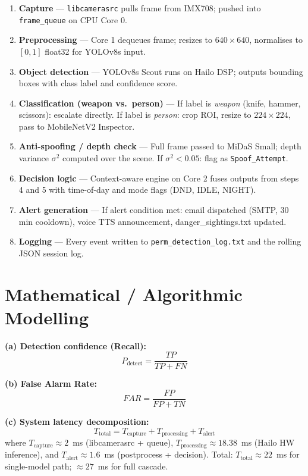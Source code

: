 \documentclass[12pt,a4paper]{article}
\begin{document}
\begin{enumerate}[noitemsep]
  \item \textbf{Capture} — \texttt{libcamerasrc} pulls frame from IMX708; pushed into
        \texttt{frame\_queue} on CPU Core 0.
  \item \textbf{Preprocessing} — Core 1 dequeues frame; resizes to $640\times640$,
        normalises to $[0,1]$ float32 for YOLOv8s input.
  \item \textbf{Object detection} — YOLOv8s Scout runs on Hailo DSP; outputs bounding
        boxes with class label and confidence score.
  \item \textbf{Classification (weapon vs.\ person)} — If label is \emph{weapon} (knife,
        hammer, scissors): escalate directly. If label is \emph{person}: crop ROI,
        resize to $224\times224$, pass to MobileNetV2 Inspector.
  \item \textbf{Anti-spoofing / depth check} — Full frame passed to MiDaS Small;
        depth variance $\sigma^2$ computed over the scene. If $\sigma^2 < 0.05$: flag
        as \texttt{Spoof\_Attempt}.
  \item \textbf{Decision logic} — Context-aware engine on Core 2 fuses outputs from
        steps 4 and 5 with time-of-day and mode flags (DND, IDLE, NIGHT).
  \item \textbf{Alert generation} — If alert condition met: email dispatched (SMTP,
        30 min cooldown), voice TTS announcement, danger\_sightings.txt updated.
  \item \textbf{Logging} — Every event written to \texttt{perm\_detection\_log.txt} and
        the rolling JSON session log.
\end{enumerate}

\section{Mathematical / Algorithmic Modelling}

\textbf{(a) Detection confidence (Recall):}
\begin{equation}
  P_{\text{detect}} = \frac{TP}{TP + FN}
  \label{eq:recall}
\end{equation}

\textbf{(b) False Alarm Rate:}
\begin{equation}
  FAR = \frac{FP}{FP + TN}
  \label{eq:far}
\end{equation}

\textbf{(c) System latency decomposition:}
\begin{equation}
  T_{\text{total}} = T_{\text{capture}} + T_{\text{processing}} + T_{\text{alert}}
  \label{eq:latency}
\end{equation}
where $T_{\text{capture}} \approx 2$~ms (libcamerasrc + queue),
$T_{\text{processing}} \approx 18.38$~ms (Hailo HW inference),
and $T_{\text{alert}} \approx 1.6$~ms (postprocess + decision). Total: $T_{\text{total}} \approx 22$~ms for single-model path; $\approx 27$~ms for full cascade.
\end{document}
